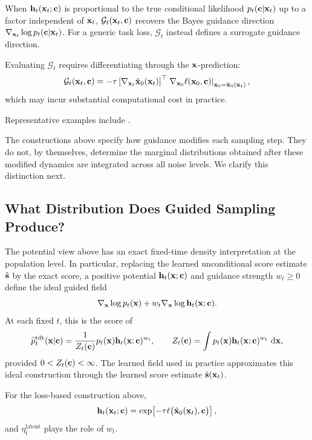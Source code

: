 When ${\mathbf{h}}_t({\mathbf{x}}_t;{\mathbf{c}})$ is proportional to the true conditional likelihood
$p_t({\mathbf{c}}|{\mathbf{x}}_t)$ up to a factor independent of ${\mathbf{x}}_t$,
$\mathcal G_t({\mathbf{x}}_t,{\mathbf{c}})$ recovers the Bayes guidance direction
$\nabla_{{\mathbf{x}}_t}\log p_t({\mathbf{c}}|{\mathbf{x}}_t)$. For a generic task loss,
$\mathcal G_t$ instead defines a surrogate guidance direction.

Evaluating $\mathcal G_t$ requires differentiating through the
${\mathbf{x}}$-prediction:
\[
\mathcal G_t({\mathbf{x}}_t,{\mathbf{c}})
=
-\tau
\left[
\nabla_{{\mathbf{x}}_t}\hat{{\mathbf{x}}}_0({\mathbf{x}}_t)
\right]^\top
\left.
\nabla_{{\mathbf{x}}_0}\ell({\mathbf{x}}_0,{\mathbf{c}})
\right|_{{\mathbf{x}}_0=\hat{{\mathbf{x}}}_0({\mathbf{x}}_t)},
\]
which may incur substantial computational cost in practice.

Representative examples include
\citep{yu2023freedom,chung2022diffusion,bansal2023universal}.

The constructions above specify how guidance modifies each sampling step.
They do not, by themselves, determine the marginal distributions obtained
after these modified dynamics are integrated across all noise levels. We
clarify this distinction next.

\subsection{What Distribution Does Guided Sampling Produce?}
\label{subsec:guided-marginal-path}

The potential view above has an exact fixed-time density interpretation at the
population level. In particular, replacing the learned unconditional score
estimate $\hat{{\mathbf{s}}}$ by the exact score, a positive potential
${\mathbf{h}}_t({\mathbf{x}};{\mathbf{c}})$ and guidance strength $w_t\geq0$ define the ideal guided
field
\[
\nabla_{{\mathbf{x}}}\log p_t({\mathbf{x}})
+
w_t\nabla_{{\mathbf{x}}}\log{\mathbf{h}}_t({\mathbf{x}};{\mathbf{c}}).
\]
At each fixed $t$, this is the score of
\begin{align}
\widetilde p_t^{\mathrm{tilt}}({\mathbf{x}}|{\mathbf{c}})
=
\frac{1}{Z_t({\mathbf{c}})}
p_t({\mathbf{x}}){\mathbf{h}}_t({\mathbf{x}};{\mathbf{c}})^{w_t},
\qquad
Z_t({\mathbf{c}})
=
\int
p_t({\mathbf{x}}){\mathbf{h}}_t({\mathbf{x}};{\mathbf{c}})^{w_t}\,\mathop{}\!\mathrm{d}{\mathbf{x}},
\label{eq:guided-fixed-time-tilt}
\end{align}
provided $0<Z_t({\mathbf{c}})<\infty$. The learned field used in practice approximates
this ideal construction through the learned score estimate
$\hat{{\mathbf{s}}}({\mathbf{x}}_t)$.

For the loss-based construction above,
\[
{\mathbf{h}}_t({\mathbf{x}}_t;{\mathbf{c}})
=
\exp\!\left[
-\tau\ell\bigl(\hat{{\mathbf{x}}}_0({\mathbf{x}}_t),{\mathbf{c}}\bigr)
\right],
\]
and $\eta_t^{\mathrm{latent}}$ plays the role of $w_t$.


